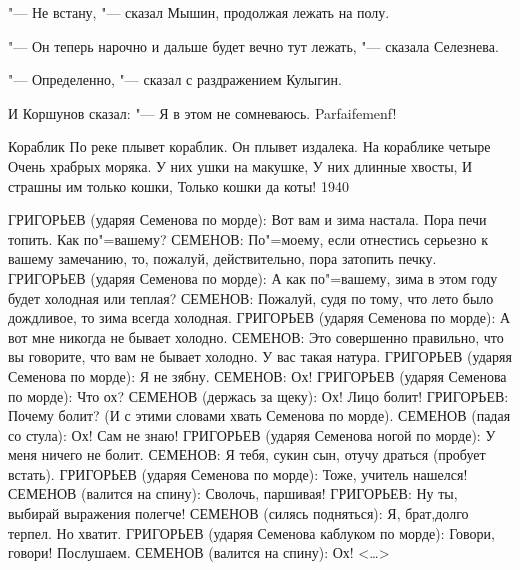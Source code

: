 "--- Не встану,  "---  сказал Мышин, продолжая
лежать на полу.

"--- Он теперь нарочно и дальше будет вечно
тут лежать, "--- сказала Селезнева.

"--- Определенно, "--- сказал  с  раздражением
Кулыгин.

    И Коршунов сказал:
"--- Я в этом не сомневаюсь. Parfaifemenf!

Кораблик 
               По реке плывет кораблик. 
               Он плывет издалека. 
               На кораблике четыре 
               Очень храбрых моряка. 
               У них ушки на макушке, 
               У них длинные хвосты, 
               И страшны им только кошки, 
               Только кошки да коты! 
               1940 
					  
ГРИГОРЬЕВ  (ударяя  Семенова по морде):  Вот
    вам  и  зима  настала. Пора печи топить.
    Как по"=вашему?
СЕМЕНОВ:  По"=моему,  если отнестись серьезно
    к вашему замечанию,  то, пожалуй, действительно, пора затопить печку.
ГРИГОРЬЕВ (ударяя Семенова по морде):  А как
    по"=вашему, зима в этом году будет холодная или теплая?
СЕМЕНОВ: Пожалуй, судя по тому, что лето было дождливое, то зима всегда холодная.
ГРИГОРЬЕВ (ударяя Семенова  по морде): А вот
    мне никогда не бывает холодно.
СЕМЕНОВ:  Это совершенно правильно,  что  вы
    говорите,  что  вам не бывает холодно. У
    вас такая натура.
ГРИГОРЬЕВ  (ударяя Семенова по морде):  Я не
    зябну.
СЕМЕНОВ: Ох!
ГРИГОРЬЕВ  (ударяя  Семенова  по морде): Что
    ох?
СЕМЕНОВ  (держась за щеку):  Ох! Лицо болит!
ГРИГОРЬЕВ: Почему болит? (И с этими  словами
    хвать Семенова по морде).
СЕМЕНОВ (падая со  стула):  Ох! Сам не знаю!
ГРИГОРЬЕВ  (ударяя Семенова ногой по морде):
    У меня ничего не болит.
СЕМЕНОВ:  Я тебя,  сукин сын,  отучу драться
    (пробует встать).
ГРИГОРЬЕВ (ударяя Семенова по морде):  Тоже,
    учитель нашелся!
СЕМЕНОВ (валится на спину):  Сволочь, паршивая!
ГРИГОРЬЕВ:  Ну ты, выбирай  выражения полегче!
СЕМЕНОВ  (силясь  подняться):  Я, брат,долго
     терпел. Но хватит.
ГРИГОРЬЕВ  (ударяя Семенова каблуком по морде): Говори, говори! Послушаем.
СЕМЕНОВ (валится на спину): Ох! <\dots>

